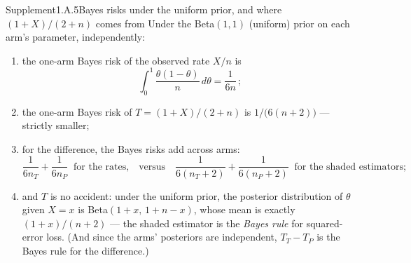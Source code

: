 \documentclass[main.tex]{subfiles}
\begin{document}
\begin{ObjL}{Supplement}{1.A.5}{Bayes risks under the uniform prior, and where $(1+X)/(2+n)$ comes from}
Under the Beta$(1,1)$ (uniform) prior on each arm's parameter, independently:
\begin{enumerate}[leftmargin=2.2em,itemsep=2pt,topsep=2pt]
  \item the one-arm Bayes risk of the observed rate $X/n$ is
        \[ \int_0^1 \frac{\theta(1-\theta)}{n}\,d\theta=\frac{1}{6n} \,; \]
  \item the one-arm Bayes risk of $T=(1+X)/(2+n)$ is $1/\big(6(n+2)\big)$ --- strictly
        smaller;
  \item for the difference, the Bayes risks add across arms:
        \[ \frac{1}{6n_T}+\frac{1}{6n_P} \ \text{ for the rates,}\quad\text{versus}\quad
           \frac{1}{6(n_T+2)}+\frac{1}{6(n_P+2)} \ \text{ for the shaded estimators;} \]
  \item and $T$ is no accident: under the uniform prior, the posterior distribution of
        $\theta$ given $X=x$ is Beta$(1+x,\,1+n-x)$, whose mean is exactly $(1+x)/(n+2)$ ---
        the shaded estimator is the \emph{Bayes rule} for squared-error loss. (And since the
        arms' posteriors are independent, $T_T-T_P$ is the Bayes rule for the difference.)
\end{enumerate}
\end{ObjL}
\end{document}
